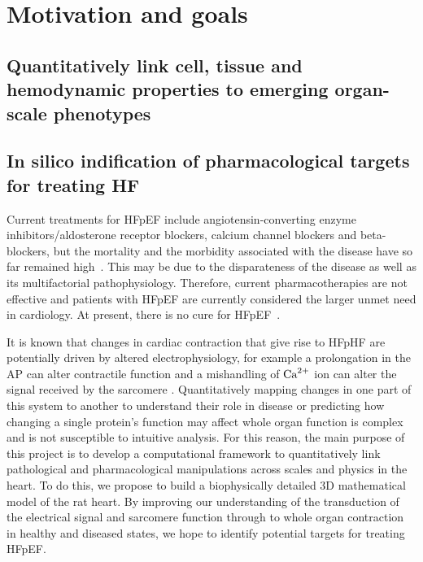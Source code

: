 %
%
%
\section{Motivation and goals}


%
%
%
\subsection{Quantitatively link cell, tissue and hemodynamic properties to emerging organ-scale phenotypes}

%
%
%
\subsection{In silico indification of pharmacological targets for treating HF}
Current treatments for HFpEF include angiotensin-converting enzyme inhibitors/aldosterone receptor blockers, calcium channel
blockers and beta-blockers, but the mortality and the morbidity associated with the
disease have so far remained high~\cite{Adamczak:2020}. This may be due to the disparateness of the disease as well as its multifactorial pathophysiology. Therefore, current pharmacotherapies are not effective and patients with HFpEF are
currently considered the larger unmet need in cardiology. At present, there is no cure for HFpEF~\cite{Owan:2006}.

\vspace{0.2cm}
It is known that changes in cardiac contraction that give rise to HFpHF are potentially driven by altered electrophysiology, for example a prolongation in the AP can alter contractile function and a mishandling of $\textrm{Ca}^{2+}$ ion can alter the signal received by the sarcomere \cite{Asp:2013, Gorski:2015}. Quantitatively mapping changes in one part of this system to another to understand their role in disease or predicting how changing a single protein's function may affect whole organ function is complex and is not susceptible to intuitive analysis. For this reason, the main purpose of this project is to develop a computational framework to quantitatively link pathological and pharmacological manipulations across scales and physics in the heart. To do this, we propose to build a biophysically detailed $3$D mathematical model of the rat heart. By improving our understanding of the transduction of the electrical signal and sarcomere function through to whole organ contraction in healthy and diseased states, we hope to identify potential targets for treating HFpEF.












